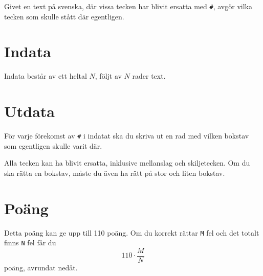 
Givet en text på svenska, där vissa tecken har blivit ersatta med \texttt{#}, avgör vilka tecken som skulle stått där egentligen.

\section*{Indata}
Indata består av ett heltal $N$, följt av $N$ rader text.

\section*{Utdata}
För varje förekomst av \texttt{#} i indatat ska du skriva ut en rad med vilken bokstav som egentligen skulle varit där.

Alla tecken kan ha blivit ersatta, inklusive mellanslag och skiljetecken. Om du ska rätta en bokstav, måste du även ha rätt på stor och liten bokstav.

\section*{Poäng}

Detta poäng kan ge upp till 110 poäng. Om du korrekt rättar \texttt{M} fel och det totalt finns \texttt{N} fel får du 
$$110 \cdot \frac{M}{N}$$
poäng, avrundat nedåt.
